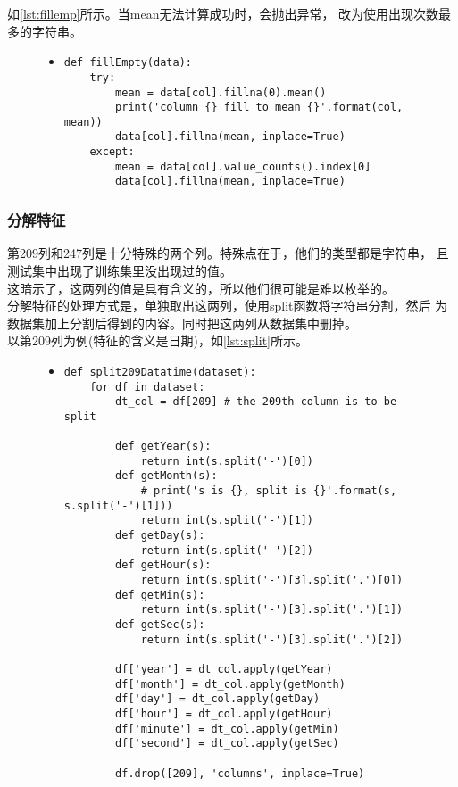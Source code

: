 \documentclass[a4paper]{article}
\begin{document}
如\autoref{lst:fillemp}所示。当mean无法计算成功时，会抛出异常，
改为使用出现次数最多的字符串。
\begin{figure}[!hbt]
\begin{itemize}
\item[] \begin{lstlisting}[style=mypython, label=lst:fillemp, caption=填补空值的过程]
def fillEmpty(data):
    try:
        mean = data[col].fillna(0).mean()
        print('column {} fill to mean {}'.format(col, mean))
        data[col].fillna(mean, inplace=True)
    except:
        mean = data[col].value_counts().index[0]
        data[col].fillna(mean, inplace=True)
\end{lstlisting}
\end{itemize}
\end{figure}

\subsubsection{分解特征}\label{subsec:split}
第209列和247列是十分特殊的两个列。特殊点在于，他们的类型都是字符串，
且测试集中出现了训练集里没出现过的值。\\

这暗示了，这两列的值是具有含义的，所以他们很可能是难以枚举的。\\

分解特征的处理方式是，单独取出这两列，使用split函数将字符串分割，然后
为数据集加上分割后得到的内容。同时把这两列从数据集中删掉。\\

以第209列为例(特征的含义是日期)，如\autoref{lst:split}所示。

\begin{figure}[!hbt]
\begin{itemize}
\item[] \begin{lstlisting}[style=mypython, label=lst:split, caption=对209列的特征工程处理]
def split209Datatime(dataset):
    for df in dataset:
        dt_col = df[209] # the 209th column is to be split

        def getYear(s):
            return int(s.split('-')[0])
        def getMonth(s):
            # print('s is {}, split is {}'.format(s, s.split('-')[1]))
            return int(s.split('-')[1])
        def getDay(s):
            return int(s.split('-')[2])
        def getHour(s):
            return int(s.split('-')[3].split('.')[0])
        def getMin(s):
            return int(s.split('-')[3].split('.')[1])
        def getSec(s):
            return int(s.split('-')[3].split('.')[2])
        
        df['year'] = dt_col.apply(getYear)
        df['month'] = dt_col.apply(getMonth)
        df['day'] = dt_col.apply(getDay)
        df['hour'] = dt_col.apply(getHour)
        df['minute'] = dt_col.apply(getMin)
        df['second'] = dt_col.apply(getSec)

        df.drop([209], 'columns', inplace=True)
\end{lstlisting}
\end{itemize}
\end{figure}
\end{document}
